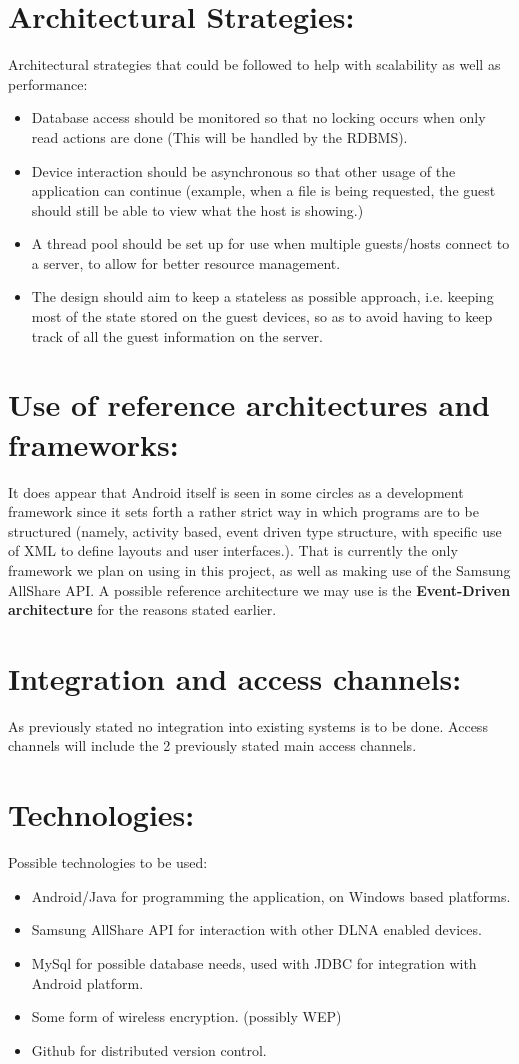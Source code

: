 \documentclass[12pt]{article}
\begin{document}
\section{Architectural Strategies:}
Architectural strategies that could be followed to help with scalability as well as performance:
\begin{itemize}
\item Database access should be monitored so that no locking occurs when only read actions are done (This will be handled by the RDBMS).
\item Device interaction should be asynchronous so that other usage of the application can continue (example, when a file is being requested, the guest should still be able to view what the host is showing.)
\item A thread pool should be set up for use when multiple guests/hosts connect to a server, to allow for better resource management.
\item The design should aim to keep a stateless as possible approach, i.e. keeping most of the state stored on the guest devices, so as to avoid having to keep track of all the guest information on the server.

\end{itemize}


\section{Use of reference architectures and frameworks:}
It does appear that Android itself is seen in some circles as a development framework since it sets forth a rather strict way in which programs are to be structured (namely, activity based, event driven type structure, with specific use of XML to define layouts and user interfaces.).
That is currently the only framework we plan on using in this project, as well as making use of the Samsung AllShare API.
A possible reference architecture we may use is the \textbf{Event-Driven architecture} for the reasons stated earlier.

\newpage
\section{Integration and access channels:}
As previously stated no integration into existing systems is to be done.
Access channels will include the 2 previously stated main access channels.

\section{Technologies:}
Possible technologies to be used:
\begin{itemize}
\item Android/Java for programming the application, on Windows based platforms.
\item Samsung AllShare API for interaction with other DLNA enabled devices.
\item MySql for possible database needs, used with JDBC for integration with Android platform.
\item Some form of wireless encryption. (possibly WEP)
\item Github for distributed version control.
\end{itemize}
\end{document}
